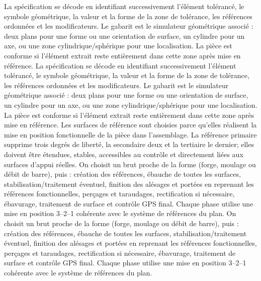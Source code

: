 \begin{corrigebox}
La spécification se décode en identifiant successivement
                l'élément tolérancé, le symbole géométrique, la valeur et la forme de la
                zone de tolérance, les références ordonnées et les modificateurs. Le
                gabarit est le simulateur géométrique associé : deux plans pour une forme
                ou une orientation de surface, un cylindre pour un axe, ou une zone
                cylindrique/sphérique pour une localisation. La pièce est conforme si
                l'élément extrait reste entièrement dans cette zone après mise en référence.
La spécification se décode en identifiant successivement
                l'élément tolérancé, le symbole géométrique, la valeur et la forme de la
                zone de tolérance, les références ordonnées et les modificateurs. Le
                gabarit est le simulateur géométrique associé : deux plans pour une forme
                ou une orientation de surface, un cylindre pour un axe, ou une zone
                cylindrique/sphérique pour une localisation. La pièce est conforme si
                l'élément extrait reste entièrement dans cette zone après mise en référence.
Les surfaces de référence sont choisies parce qu'elles
                réalisent la mise en position fonctionnelle de la pièce dans l'assemblage.
                La référence primaire supprime trois degrés de liberté, la secondaire deux
                et la tertiaire le dernier; elles doivent être étendues, stables,
                accessibles au contrôle et directement liées aux surfaces d'appui réelles.
On choisit un brut proche de la forme (forge, moulage ou
                débit de barre), puis : création des références, ébauche de toutes les
                surfaces, stabilisation/traitement éventuel, finition des alésages et
                portées en reprenant les références fonctionnelles, perçages et taraudages,
                rectification si nécessaire, ébavurage, traitement de surface et contrôle
                GPS final. Chaque phase utilise une mise en position 3--2--1 cohérente avec
                le système de références du plan.
On choisit un brut proche de la forme (forge, moulage ou
                débit de barre), puis : création des références, ébauche de toutes les
                surfaces, stabilisation/traitement éventuel, finition des alésages et
                portées en reprenant les références fonctionnelles, perçages et taraudages,
                rectification si nécessaire, ébavurage, traitement de surface et contrôle
                GPS final. Chaque phase utilise une mise en position 3--2--1 cohérente avec
                le système de références du plan.
\end{corrigebox}
